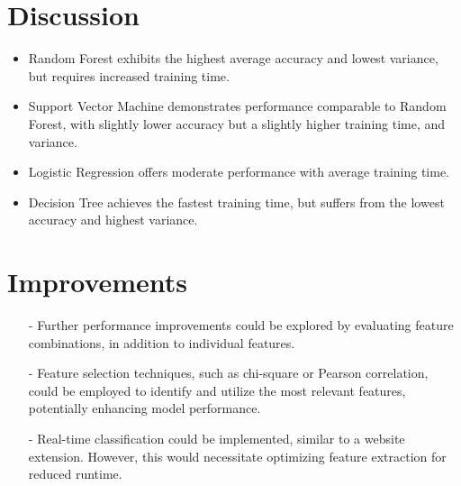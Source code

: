 \section{Discussion}
\begin{itemize}
    \item Random Forest exhibits the highest average accuracy and lowest variance, but requires increased training time.
    \item Support Vector Machine demonstrates performance comparable to Random Forest, with slightly lower accuracy but a slightly higher training time, and variance.
    \item Logistic Regression offers moderate performance with average training time.
    \item Decision Tree achieves the fastest training time, but suffers from the lowest accuracy and highest variance.
\end{itemize}
\section{Improvements}
\begin{itemize}
    \item[-] Further performance improvements could be explored by evaluating feature combinations, in addition to individual features.
    \item[-] Feature selection techniques, such as chi-square or Pearson correlation, could be employed to identify and utilize the most relevant features, potentially enhancing model performance.
    \item[-] Real-time classification could be implemented, similar to a website extension. However, this would necessitate optimizing feature extraction for reduced runtime.
\end{itemize}